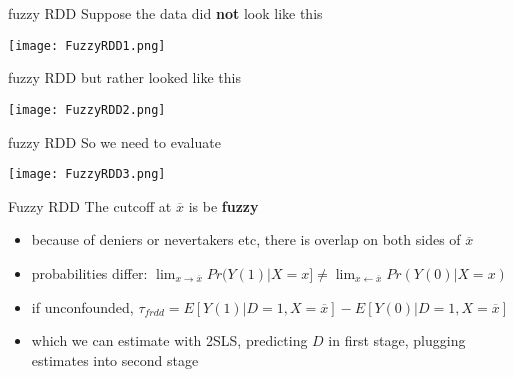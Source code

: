 \documentclass[aspectratio=169]{beamer}
\begin{document}
		\begin{frame}{fuzzy RDD}
			Suppose the data did \textbf{not} look like this \\ \vspace*{.15cm}
			\begin{center}
				\texttt{[image: FuzzyRDD1.png]}
			\end{center}
		\end{frame}

		\begin{frame}{fuzzy RDD}
			but rather looked like this \\ \vspace*{.15cm}
			\begin{center}
				\texttt{[image: FuzzyRDD2.png]}
			\end{center}
		\end{frame}

		\begin{frame}{fuzzy RDD}
			So we need to evaluate \\ \vspace*{.15cm}
			\begin{center}
				\texttt{[image: FuzzyRDD3.png]}
			\end{center}
		\end{frame}

		\begin{frame}{Fuzzy RDD}
			The cutcoff at $\overline{x}$ is be \textbf{fuzzy}
				\begin{itemize}
					\item<2-> because of deniers or nevertakers etc, there is overlap on both sides of $\overline{x}$
					\item<3-> probabilities differ: $\lim_{x \to \overline{x}} Pr(Y(1)|X=x] \neq \lim_{x \gets \overline{x}} Pr(Y(0)|X=x) $
				\end{itemize}
				\begin{center}
				\end{center}
				\begin{itemize}
					\item<4-> if unconfounded, $\tau_{frdd} = E[Y(1)|D=1, X=\overline{x}] -  E[Y(0)|D=1, X=\overline{x}] $
					\item<5>  which we can estimate with 2SLS, predicting $D$ in first stage, plugging estimates into second stage
				\end{itemize}
		\end{frame}
\end{document}
